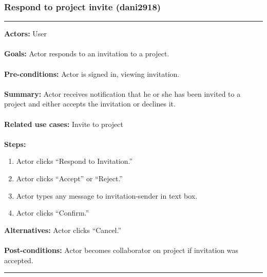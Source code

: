 \documentclass[11pt]{report}
\begin{document}
\subsubsection{Respond to project invite (dani2918)}
\vspace{2pt}
\hrule
\vspace{8pt}
 \textbf{Actors:} User  \\ \\
\textbf{Goals:} Actor responds to an invitation to a project.\\ \\
 \textbf{Pre-conditions:} Actor is signed in, viewing invitation.  \\ \\
\textbf{Summary:} Actor receives notification that he or she has been invited to a project and either accepts the invitation or declines it. \\ \\
\textbf{Related use cases:} Invite to project \\ \\
\textbf{Steps:} \begin{enumerate}
  \item Actor clicks ``Respond to Invitation.''
  \item Actor clicks ``Accept'' or ``Reject.''
  \item Actor types any message to invitation-sender in text box.
  \item Actor clicks ``Confirm.''
 \end{enumerate}
 \textbf{Alternatives:} Actor clicks ``Cancel.'' \\ \\
 \textbf{Post-conditions:} Actor becomes collaborator on project if invitation was accepted. \\
\vspace{8pt}
\hrule
\newpage
\end{document}
